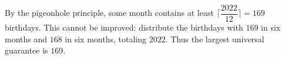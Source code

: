 By the pigeonhole principle, some month contains at least $\lceil\dfrac{2022}{12}\rceil=169$ birthdays. This cannot be improved: distribute the birthdays with $169$ in six months and $168$ in six months, totaling $2022$. Thus the largest universal guarantee is $\boxed{169}$.
